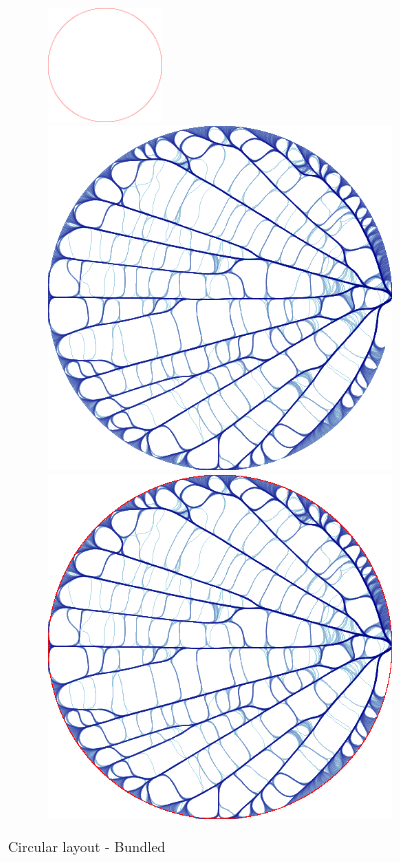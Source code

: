 \documentclass[12pt, a4paper]{article}
\begin{document}
\begin{figure}[H]
    \centering
    \begin{subfigure}[b]{\textwidth}
        \centering
        \includegraphics[width=0.33\textwidth]{src/youtube/datashader/simple/datashader/1_1}%
        \hfill
        \includegraphics[width=0.33\columnwidth]{src/youtube/datashader/simple/datashader/1_2}%
        \hfill
        \includegraphics[width=0.33\columnwidth]{src/youtube/datashader/simple/datashader/1_3}
    \end{subfigure}
    \caption{Circular layout - Bundled}
    \label{fig:ds_show_1}
\end{figure}
\end{document}
